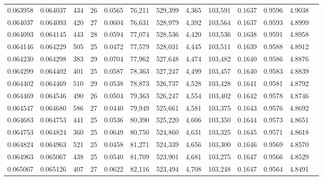 \begin{tabular}{rrrrrrrrrrrrr}
0.063958 & 0.064037 & 434 &  26 &                                     0.0565 &  76,211 & 529,399 &   4,365 & 103,591 & 0.1637 & 0.9596 & 4.9038 \\
0.064037 & 0.064093 & 420 &  27 &                                     0.0604 &  76,631 & 528,979 &   4,392 & 103,564 & 0.1637 & 0.9593 & 4.8999 \\
0.064093 & 0.064145 & 443 &  28 &                                     0.0594 &  77,074 & 528,536 &   4,420 & 103,536 & 0.1638 & 0.9591 & 4.8958 \\
0.064146 & 0.064229 & 505 &  25 &                                     0.0472 &  77,579 & 528,031 &   4,445 & 103,511 & 0.1639 & 0.9588 & 4.8912 \\
0.064230 & 0.064298 & 383 &  29 &                                     0.0704 &  77,962 & 527,648 &   4,474 & 103,482 & 0.1640 & 0.9586 & 4.8876 \\
0.064299 & 0.064402 & 401 &  25 &                                     0.0587 &  78,363 & 527,247 &   4,499 & 103,457 & 0.1640 & 0.9583 & 4.8839 \\
0.064402 & 0.064469 & 510 &  29 &                                     0.0538 &  78,873 & 526,737 &   4,528 & 103,428 & 0.1641 & 0.9581 & 4.8792 \\
0.064469 & 0.064546 & 490 &  26 &                                     0.0504 &  79,363 & 526,247 &   4,554 & 103,402 & 0.1642 & 0.9578 & 4.8746 \\
0.064547 & 0.064680 & 586 &  27 &                                     0.0440 &  79,949 & 525,661 &   4,581 & 103,375 & 0.1643 & 0.9576 & 4.8692 \\
0.064683 & 0.064753 & 441 &  25 &                                     0.0536 &  80,390 & 525,220 &   4,606 & 103,350 & 0.1644 & 0.9573 & 4.8651 \\
0.064753 & 0.064824 & 360 &  25 &                                     0.0649 &  80,750 & 524,860 &   4,631 & 103,325 & 0.1645 & 0.9571 & 4.8618 \\
0.064824 & 0.064963 & 521 &  25 &                                     0.0458 &  81,271 & 524,339 &   4,656 & 103,300 & 0.1646 & 0.9569 & 4.8570 \\
0.064963 & 0.065067 & 438 &  25 &                                     0.0540 &  81,709 & 523,901 &   4,681 & 103,275 & 0.1647 & 0.9566 & 4.8529 \\
0.065067 & 0.065126 & 407 &  27 &                                     0.0622 &  82,116 & 523,494 &   4,708 & 103,248 & 0.1647 & 0.9564 & 4.8491 \\

\end{tabular}
